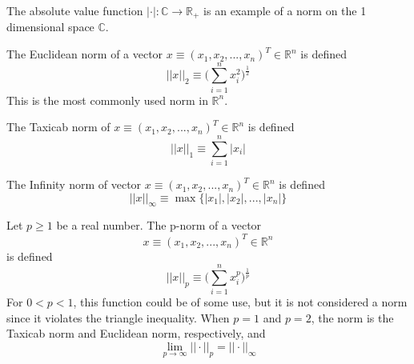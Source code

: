   \begin{example}
    The absolute value function $|\cdot|: \mathbb{C} \longrightarrow \mathbb{R}_+$ is an example of a norm on the 1 dimensional space $\mathbb{C}$. 
  \end{example}

  \begin{example}
    The Euclidean norm of a vector $x \equiv (x_1, x_2, ..., x_n)^T \in \mathbb{R}^n$ is defined
    \begin{equation}
      ||x||_2 \equiv \bigg( \sum_{i=1}^n x_i^2 \bigg)^{\frac{1}{2}}
    \end{equation}
    This is the most commonly used norm in $\mathbb{R}^n$. 
  \end{example}

  \begin{example}
    The Taxicab norm of $x \equiv (x_1, x_2, ..., x_n)^T \in \mathbb{R}^n$ is defined
    \begin{equation}
      ||x||_1 \equiv \sum_{i=1}^n |x_i|
    \end{equation}
  \end{example}

  \begin{example}
    The Infinity norm of vector $x \equiv (x_1, x_2, ..., x_n)^T \in \mathbb{R}^n$ is defined
    \begin{equation}
      ||x||_\infty \equiv \max{\{|x_1|, |x_2|, ..., |x_n|\}}
    \end{equation}
  \end{example}

  \begin{example}
    Let $p\geq 1$ be a real number. The p-norm of a vector 
    \begin{equation}
      x \equiv (x_1, x_2, ..., x_n)^T \in \mathbb{R}^n
    \end{equation}
    is defined
    \begin{equation}
      ||x||_p \equiv \bigg( \sum_{i=1}^n x_i^p \bigg)^{\frac{1}{p}}
    \end{equation}
    For $0<p<1$, this function could be of some use, but it is not considered a norm since it violates the triangle inequality. When $p = 1$ and $p =2$, the norm is the Taxicab norm and Euclidean norm, respectively, and 
    \begin{equation}
      \lim_{p \rightarrow \infty} ||\cdot||_p = ||\cdot||_\infty
    \end{equation}
  \end{example}

